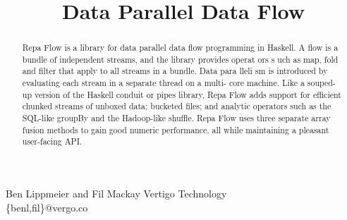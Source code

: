 \documentclass[preprint]{sigplanconf}
\begin{document}
\title          {Data Parallel Data Flow}
 

\authorinfo
{       Ben Lippmeier and Fil Mackay  }
{ \shortstack
  {     Vertigo Technology \\
        \textsf{\{benl,fil\}@vergo.co}
  }
}

\maketitle
\makeatactive

\begin{abstract}
Repa Flow is a library for data parallel data flow programming in Haskell. A  flow is a bundle of independent streams, and the library provides operat ors s uch  as map, fold and filter that apply to all streams in a bundle. Data para lleli sm is introduced by evaluating each stream in a separate thread on a multi- core machine. Like a souped-up version of the Haskell conduit or pipes library, Repa Flow adds support for efficient chunked streams of unboxed data; bucketed files; and analytic operators such as the SQL-like groupBy and the Hadoop-like shuffle. Repa Flow uses three separate array fusion methods to gain good numeric performance, all while maintaining a pleasant user-facing API.
\end{abstract}










% 
% 
% 
\end{document}
